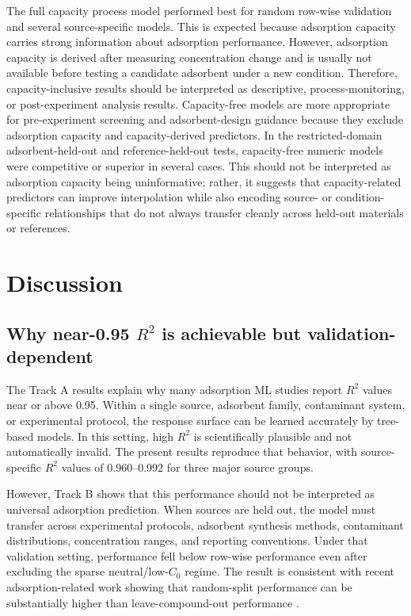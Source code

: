 \documentclass[review,12pt,number]{elsarticle}
\begin{document}
The full capacity process model performed best for random row-wise validation and several source-specific models. This is expected because adsorption capacity carries strong information about adsorption performance. However, adsorption capacity is derived after measuring concentration change and is usually not available before testing a candidate adsorbent under a new condition. Therefore, capacity-inclusive results should be interpreted as descriptive, process-monitoring, or post-experiment analysis results. Capacity-free models are more appropriate for pre-experiment screening and adsorbent-design guidance because they exclude adsorption capacity and capacity-derived predictors. In the restricted-domain adsorbent-held-out and reference-held-out tests, capacity-free numeric models were competitive or superior in several cases. This should not be interpreted as adsorption capacity being uninformative; rather, it suggests that capacity-related predictors can improve interpolation while also encoding source- or condition-specific relationships that do not always transfer cleanly across held-out materials or references.

\section{Discussion}

\subsection{Why near-0.95 $R^2$ is achievable but validation-dependent}

The Track A results explain why many adsorption ML studies report $R^2$ values near or above 0.95. Within a single source, adsorbent family, contaminant system, or experimental protocol, the response surface can be learned accurately by tree-based models. In this setting, high $R^2$ is scientifically plausible and not automatically invalid. The present results reproduce that behavior, with source-specific $R^2$ values of 0.960--0.992 for three major source groups.

However, Track B shows that this performance should not be interpreted as universal adsorption prediction. When sources are held out, the model must transfer across experimental protocols, adsorbent synthesis methods, contaminant distributions, concentration ranges, and reporting conventions. Under that validation setting, performance fell below row-wise performance even after excluding the sparse neutral/low-$C_0$ regime. The result is consistent with recent adsorption-related work showing that random-split performance can be substantially higher than leave-compound-out performance \cite{patel2026}.
\end{document}

